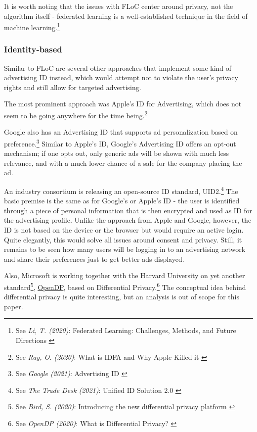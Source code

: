 It is worth noting that the issues with FLoC center around privacy, not the algorithm itself - federated learning is a well-established technique in the field of machine learning.\footnote{See \textit{Li, T. (2020)}: Federated Learning: Challenges, Methods, and Future Directions \cite{9084352}}

\subsubsection{Identity-based}

Similar to FLoC are several other approaches that implement some kind of advertising ID instead, which would attempt not to violate the user's privacy rights and still allow for targeted advertising. 

The most prominent approach was Apple's ID for Advertising, which does not seem to be going anywhere for the time being.\footnote{See \textit{Ray, O. (2020)}: What is IDFA and Why Apple Killed it \cite{cleanRoom}}

Google also has an Advertising ID that supports ad personalization based on preference.\footnote{See \textit{Google (2021)}: Advertising ID \cite{advertisingId}} Similar to Apple's ID, Google's Advertising ID offers an opt-out mechanism; if one opts out, only generic ads will be shown with much less relevance, and with a much lower chance of a sale for the company placing the ad.

An industry consortium is releasing an open-source ID standard, UID2.\footnote{See \textit{The Trade Desk (2021)}: Unified ID Solution 2.0 \cite{tradeDesk}} The basic premise is the same as for Google's or Apple's ID - the user is identified through a piece of personal information that is then encrypted and used as ID for the advertising profile. Unlike the approach from Apple and Google, however, the ID is not based on the device or the browser but would require an active login. Quite elegantly, this would solve all issues around consent and privacy. Still, it remains to be seen how many users will be logging in to an advertising network and share their preferences just to get better ads displayed.

Also, Microsoft is working together with the Harvard University on yet another standard\footnote{See \textit{Bird, S. (2020)}: Introducing the new differential privacy platform \cite{openDp}}, \href{https://opendp.org/}{OpenDP}, based on Differential Privacy.\footnote{See \textit{OpenDP (2020)}: What is Differential Privacy? \cite{diffPrivacy}} The conceptual idea behind differential privacy is quite interesting, but an analysis is out of scope for this paper.

